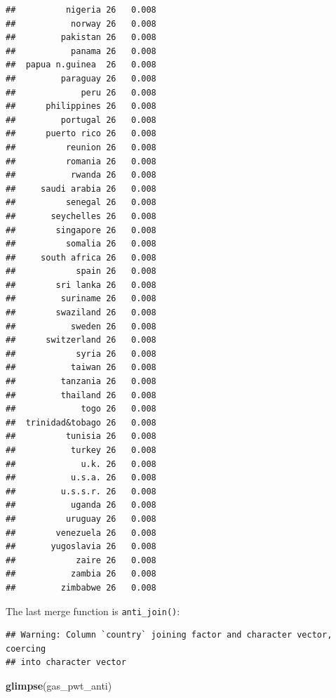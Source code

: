 \documentclass[]{gitbook}
\newenvironment{Shaded}{\begin{snugshade}}{\end{snugshade}}
\newcommand{\DataTypeTok}[1]{\textcolor[rgb]{0.13,0.29,0.53}{#1}}
\newcommand{\KeywordTok}[1]{\textcolor[rgb]{0.13,0.29,0.53}{\textbf{#1}}}
\newcommand{\NormalTok}[1]{#1}
\newcommand{\OperatorTok}[1]{\textcolor[rgb]{0.81,0.36,0.00}{\textbf{#1}}}
\newcommand{\StringTok}[1]{\textcolor[rgb]{0.31,0.60,0.02}{#1}}
\theoremstyle{definition}
\theoremstyle{definition}
\theoremstyle{definition}
\theoremstyle{remark}
\begin{document}
\begin{verbatim}
##          nigeria 26   0.008
##           norway 26   0.008
##         pakistan 26   0.008
##           panama 26   0.008
##  papua n.guinea  26   0.008
##         paraguay 26   0.008
##             peru 26   0.008
##      philippines 26   0.008
##         portugal 26   0.008
##      puerto rico 26   0.008
##          reunion 26   0.008
##          romania 26   0.008
##           rwanda 26   0.008
##     saudi arabia 26   0.008
##          senegal 26   0.008
##       seychelles 26   0.008
##        singapore 26   0.008
##          somalia 26   0.008
##     south africa 26   0.008
##            spain 26   0.008
##        sri lanka 26   0.008
##         suriname 26   0.008
##        swaziland 26   0.008
##           sweden 26   0.008
##      switzerland 26   0.008
##            syria 26   0.008
##           taiwan 26   0.008
##         tanzania 26   0.008
##         thailand 26   0.008
##             togo 26   0.008
##  trinidad&tobago 26   0.008
##          tunisia 26   0.008
##           turkey 26   0.008
##             u.k. 26   0.008
##           u.s.a. 26   0.008
##         u.s.s.r. 26   0.008
##           uganda 26   0.008
##          uruguay 26   0.008
##        venezuela 26   0.008
##       yugoslavia 26   0.008
##            zaire 26   0.008
##           zambia 26   0.008
##         zimbabwe 26   0.008
\end{verbatim}

The last merge function is \texttt{anti\_join()}:

\begin{Shaded}
\end{Shaded}

\begin{verbatim}
## Warning: Column `country` joining factor and character vector, coercing
## into character vector
\end{verbatim}

\begin{Shaded}
\begin{Highlighting}[]
\KeywordTok{glimpse}\NormalTok{(gas_pwt_anti)}
\end{Highlighting}
\end{Shaded}
\end{document}
